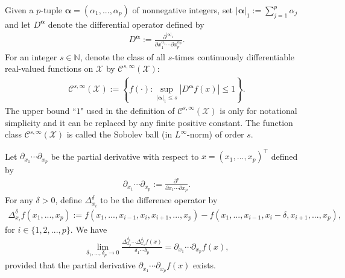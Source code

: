 \documentclass[11pt]{article}
\def\bs{\boldsymbol}
\numberwithin{equation}{section}
\begin{document}
Given a $p$-tuple $\bs{\alpha}=(\alpha_1,...,\alpha_p)$ of nonnegative integers, set $|\boldsymbol{\alpha}|_{1}:=\sum_{j=1}^p\alpha_j$ and let $D^{\bs{\alpha}}$ denote the differential operator defined by
\begin{align*}
	D^{\bs{\alpha}}:=\frac{\partial^{|\bs{\alpha}|_1}}{\partial x_1^{\alpha_1}\cdots \partial x_p^{\alpha_p}}.
\end{align*}
For an integer $s\in\mathbb{N}$, denote the class of all $s$-times continuously differentiable real-valued functions on $\mathcal{X}$ by $\mathcal{C}^{s,\infty}(\mathcal{X})$:
\begin{align}\label{def:C^s}
\mathcal{C}^{s,\infty}(\mathcal{X}):=\left\{f(\cdot):\sup_{|\bs{\alpha}|_1\leq s}|D^{\bs{\alpha}}f(x)|\leq 1\right\}.
\end{align}
The upper bound ``$1$" used in the definition of $\mathcal{C}^{s,\infty}(\mathcal{X})$  is only for notational simplicity and it can be replaced by any finite positive constant. The function class $\mathcal{C}^{s,\infty}(\mathcal{X})$ is called the  Sobolev ball (in $L^{\infty}$-norm) of order $s$.


Let $\partial_{x_1}\cdots \partial_{x_p}$ be the  partial derivative with respect to $x=(x_1,...,x_p)^{\top}$ defined by
\begin{align*}
\partial_{x_1}\cdots \partial_{x_p}:=\frac{\partial^{p}}{\partial x_1\cdots \partial x_p}.
\end{align*}
For any  $\delta>0$, define $\Delta_{x_i}^{\delta}$ to be the difference operator by
\begin{align*}
	\Delta_{x_i}^{\delta}f\left(x_1,...,x_p\right):=f\left(x_1,...,x_{i-1},x_i,x_{i+1},...,x_p\right)-f\left(x_1,...,x_{i-1},x_i-\delta,x_{i+1},...,x_p\right),
\end{align*}
for $i\in\{1,2,...,p\}$. We have
\begin{align*}
	\lim_{\delta_1,...,\delta_p\to 0}\frac{\Delta_{x_p}^{\delta_p}\cdots \Delta_{x_1}^{\delta_1}f\left(x\right)}{\delta_1\cdots \delta_p}=\partial_{x_1}\cdots \partial_{x_p} f(x),
\end{align*}
provided that  the partial derivative $\partial_{x_1}\cdots \partial_{x_p} f(x)$ exists.
\end{document}

